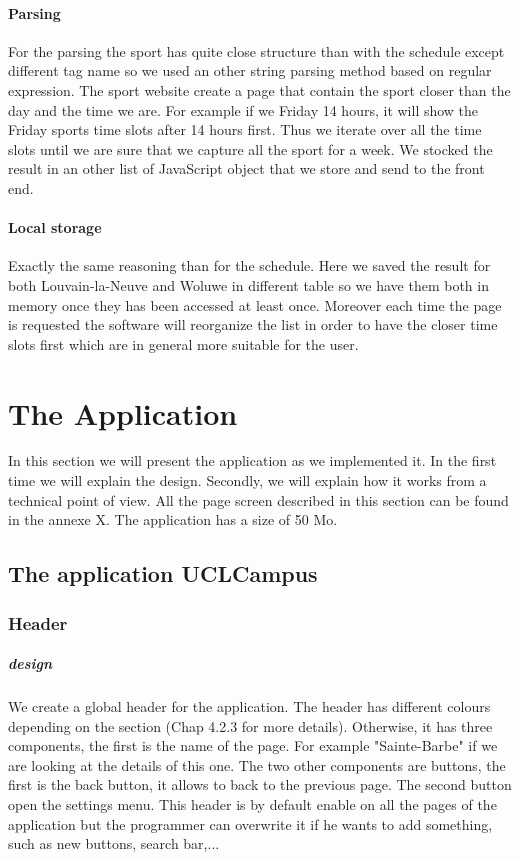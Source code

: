 \documentclass{eplmastersthesis}
\begin{document}
\subsubsection{Parsing}
For the parsing the sport has quite close structure than with the schedule except different tag name so we used an other string parsing method based on regular expression. The sport website create a page that contain the sport closer than the day and the time we are. For example if we Friday 14 hours, it will show the Friday sports time slots after 14 hours first. Thus we iterate over all the time slots until we are sure that we capture all the sport for a week. We stocked the result in an other list of JavaScript object that we store and send to the front end.
\subsubsection{Local storage}
Exactly the same reasoning than for the schedule. Here we saved the result for both Louvain-la-Neuve and Woluwe in different table so we have them both in memory once they has been accessed at least once. Moreover each time the page is requested the software will reorganize the list in order to have the closer time slots first which are in general more suitable for the user. 

\newpage

\chapter{The Application}

In this section we will present the application as we implemented it. In the first time we will explain the design. Secondly, we will explain how it works from a technical point of view. All the page screen described in this section can be found in the annexe X. The application has a size of 50 Mo.

\section{The application UCLCampus}

\subsection{Header}
\paragraph{design}
We create a global header for the application. The header has different colours depending on the section (Chap 4.2.3 for more details). Otherwise, it has three components, the first is the name of the page. For example "Sainte-Barbe" if we are looking at the details of this one. The two other components are buttons, the first is the back button, it allows to back to the previous page. The second button open the settings menu. This header is by default enable on all the pages of the application but the programmer can overwrite it if he wants to add something, such as new buttons, search bar,...
\end{document}
